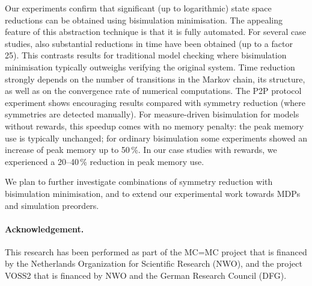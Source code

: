 \documentclass{llncs}
\begin{document}
Our experiments confirm that significant (up to logarithmic) state space reductions
can be obtained using bisimulation minimisation.
The appealing feature of this abstraction technique is that it is fully automated.
For several case studies, also substantial reductions in time have been obtained
(up to a factor 25).
This contrasts results for traditional model checking where bisimulation minimisation
typically outweighs verifying the original system.
Time reduction strongly depends on the number of transitions in the Markov chain, its 
structure, as well as on the convergence rate of numerical computations.
The P2P protocol experiment shows encouraging results compared with symmetry reduction 
\cite{KwiatkowskaNP_CAV06} (where symmetries are detected manually).
For measure-driven bisimulation for models without rewards, this speedup comes with
no memory penalty: the peak memory use is typically unchanged; for ordinary bisimulation
some experiments showed an increase of peak memory up to 50\,\%.  
In our case studies with rewards, we experienced a 20--40\,\% reduction in peak memory 
use.

We plan to further investigate combinations of symmetry reduction with bisimulation
minimisation, and to extend our experimental work towards MDPs and simulation
preorders.

{\small
\paragraph{Acknowledgement.}
This research has been performed as part of the MC=MC project that is financed by the Netherlands Organization for Scientific Research (NWO), and the project VOSS2 that is financed by NWO and the
German Research Council (DFG).
}
\end{document}
